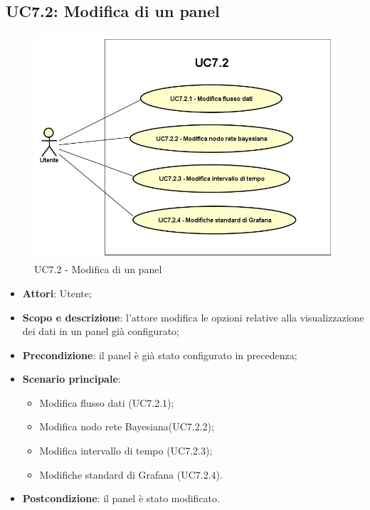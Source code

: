 \subsection{UC7.2: Modifica di un panel}
\hypertarget{UC7.2}{}
\begin{figure} [H]
	\centering
	\includegraphics[scale=0.45]{Img/UC7-2}
	\caption{UC7.2 - Modifica di un panel}\label{}
\end{figure}
\begin{itemize}
	\item \textbf{Attori}: Utente;
	\item \textbf{Scopo e descrizione}: l'attore modifica le opzioni relative alla visualizzazione dei dati in un panel già configurato;
	\item \textbf{Precondizione}: il panel è già stato configurato in precedenza;
	\item \textbf{Scenario principale}:
	\begin{itemize}
		\item Modifica flusso dati  (UC7.2.1);
		\item Modifica nodo rete Bayesiana(UC7.2.2);
		\item Modifica intervallo di tempo (UC7.2.3);
		\item Modifiche standard di Grafana  (UC7.2.4).		
	\end{itemize}
	\item \textbf{Postcondizione}: il panel è stato modificato.
\end{itemize}
